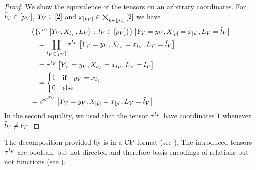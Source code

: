 \begin{proof}
    We show the equivalence of the tensors on an arbitrary coordinates.
    For $\tilde{l}_{V}\in[p_{V}]$, $Y_{V}\in[2]$ and $x_{[p_{V}]}\in\bigtimes_{k\in[p_{V}]}[2]$ we have
    \begin{align*}
        & \left\langle 
            \{\tau^{{l_{V}}}\left[Y_{V},X_{l_{V}},L_{V}\right] \,:\, l_{V}\in[p_{V}]\}
        \right\rangle \left[ Y_{V}=y_{V},X_{[p]}=x_{[p]},L_{V} = \tilde{l}_{V} \right] \\
        & \quad =
        \prod_{l_{V}\in[p_{V}]} \tau^{{l_{V}}}\left[
            Y_{V}=y_{V},X_{l_{V}}=x_{l_{V}},L_{V}=\tilde{l}_{V}
        \right] \\
        & \quad = \tau^{{\tilde{l}_{V}}}\left[
            Y_{V}=y_{V},X_{l_{V}}=x_{l_{V}},L_{V}=\tilde{l}_{V}
        \right] \\
        & \quad =
        \begin{cases}
            1 & \text{if}\quad y_{V} = x_{l_{V}} \\
            0 & \text{else}
        \end{cases} \\
        & = \beta^{\sigma^{\mathcal{F}_{V}}}\left[Y_{V}=y_{V},X_{[p]}=x_{[p]},L_{V}=\tilde{l}_{V}\right]
    \end{align*}
    In the second equality, we used that the tensor $\tau^{{l_{V}}}$ have coordinates $1$ whenever $\tilde{l}_{V}\neq l_{V}$.
\end{proof}

The decomposition provided by  is in a $\mathrm{CP}$ format (see ).
The introduced tensors $\tau^{{l_{V}}}$ are boolean, but not directed and therefore basis encodings of relations but not functions (see ).

